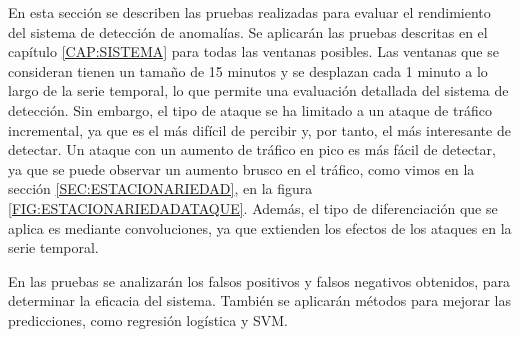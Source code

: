 En esta sección se describen las pruebas realizadas para evaluar el rendimiento del sistema de detección de anomalías. Se aplicarán las pruebas descritas en el capítulo \ref{CAP:SISTEMA} para todas las ventanas posibles. Las ventanas que se consideran tienen un tamaño de 15 minutos y se desplazan cada 1 minuto a lo largo de la serie temporal, lo que permite una evaluación detallada del sistema de detección. Sin embargo, el tipo de ataque se ha limitado a un ataque de tráfico incremental, ya que es el más difícil de percibir y, por tanto, el más interesante de detectar. Un ataque con un aumento de tráfico en pico es más fácil de detectar, ya que se puede observar un aumento brusco en el tráfico, como vimos en la sección \ref{SEC:ESTACIONARIEDAD}, en la figura \ref{FIG:ESTACIONARIEDADATAQUE}.
Además, el tipo de diferenciación que se aplica es mediante convoluciones, ya que extienden los efectos de los ataques en la serie temporal.

En las pruebas se analizarán los falsos positivos y falsos negativos obtenidos, para determinar la eficacia del sistema.
También se aplicarán métodos para mejorar las predicciones, como regresión logística y \ac{SVM}.